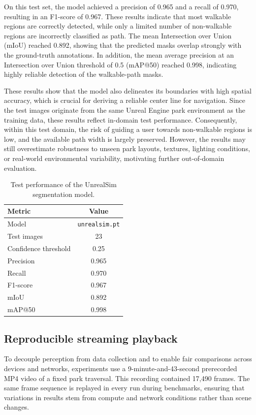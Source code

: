 \documentclass{ieeeaccess}
\begin{document}
On this test set, the model achieved a precision of 0.965 and a recall of 0.970, resulting in an F1-score of 0.967. These results indicate that most walkable regions are correctly detected, while only a limited number of non-walkable regions are incorrectly classified as path. The mean Intersection over Union (mIoU) reached 0.892, showing that the predicted masks overlap strongly with the ground-truth annotations. In addition, the mean average precision at an Intersection over Union threshold of 0.5 (mAP@50) reached 0.998, indicating highly reliable detection of the walkable-path masks.

These results show that the model also delineates its boundaries with high spatial accuracy, which is crucial for deriving a reliable center line for navigation. Since the test images originate from the same Unreal Engine park environment as the training data, these results reflect in-domain test performance. Consequently, within this test domain, the risk of guiding a user towards non-walkable regions is low, and the available path width is largely preserved. However, the results may still overestimate robustness to unseen park layouts, textures, lighting conditions, or real-world environmental variability, motivating further out-of-domain evaluation.

\begin{table}[htbp]
\centering
\caption{Test performance of the UnrealSim segmentation model.}
\label{tab:unrealsim-test-performance}
\begin{tabular}{lc}
\hline
\textbf{Metric} & \textbf{Value} \\
\hline
Model & \texttt{unrealsim.pt} \\
Test images & 23 \\
Confidence threshold & 0.25 \\
Precision & 0.965 \\
Recall & 0.970 \\
F1-score & 0.967 \\
mIoU & 0.892 \\
mAP@50 & 0.998 \\
\hline
\end{tabular}
\end{table}


\subsection{Reproducible streaming playback}
\label{sec:streamingPlayback}
To decouple perception from data collection and to enable fair comparisons across devices and networks, experiments use a 9-minute-and-43-second prerecorded MP4 video of a fixed park traversal. This recording contained 17,490 frames. The same frame sequence is replayed in every run during benchmarks, ensuring that variations in results stem from compute and network conditions rather than scene changes.
\end{document}
